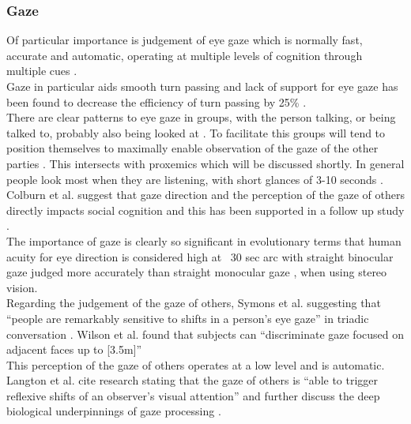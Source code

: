 \subsubsection{Gaze}
Of particular importance is judgement of eye gaze which is normally fast, accurate and automatic, operating at multiple levels of cognition through multiple cues \cite{Argyle,argyle1976gaze,Argyle1965,Argyle1976,Argyle1969, Kendon1967,Monk2002}.\\
Gaze in particular aids smooth turn passing \cite{Hedge1978} \cite{Novick1996} and lack of support for eye gaze has been found to decrease the efficiency of turn passing by 25\% \cite{Vertegaal00effectsof}.\\
There are clear patterns to eye gaze in groups, with the person talking, or being talked to, probably also being looked at \cite{Vertegaal2001} \cite{Langton2000}. To facilitate this groups will tend to position themselves to maximally enable observation of the gaze of the other parties \cite{Kendon1967}. This intersects with proxemics which will be discussed shortly.  In general people look most when they are listening, with short glances of 3-10 seconds \cite{Argyle1965}. %
Colburn et al. suggest that gaze direction and the perception of the gaze of others directly impacts social cognition \cite{Colburn2000a} and this has been supported in a follow up study \cite{Macrae2002}.\\
The importance of gaze is clearly so significant in evolutionary terms that human acuity for eye direction is considered high at ~30 sec arc \cite{Symons2004} with straight binocular gaze judged more accurately than straight monocular gaze \cite{Kluttz2009}, when using stereo vision. \\
Regarding the judgement of the gaze of others, Symons et al. suggesting that ``people are remarkably sensitive to shifts in a person's eye gaze'' in triadic conversation \cite{Symons2004}. Wilson et al. found that subjects can ``discriminate gaze focused on adjacent faces up to [3.5m]'' \cite{Wilson2000}\\
This perception of the gaze of others operates at a low level and is automatic. Langton et al. cite research stating that the gaze of others is ``able to trigger reflexive shifts of an observer's visual attention'' and further discuss the deep biological underpinnings of gaze processing \cite{doi:10.1080/713755908}. \\          
